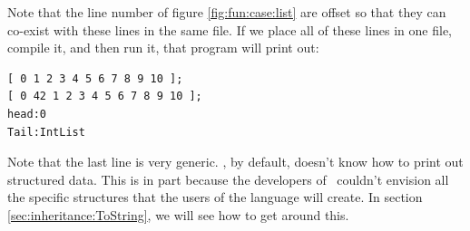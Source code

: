 \inputminted[linenos,lastline=10]{csharp}{../src/csharp/functions/list/Program.cs}

Note that the line number of figure \ref{fig:fun:case:list} are offset so that they can co-exist with these lines in the same file. If we place all of these lines in one file, compile it, and then run it, that program will print out:

\begin{verbatim}
[ 0 1 2 3 4 5 6 7 8 9 10 ];
[ 0 42 1 2 3 4 5 6 7 8 9 10 ];
head:0
Tail:IntList
\end{verbatim}

Note that the last line is very generic. \csharp, by default, doesn't know how to print out structured data. This is in part because the developers of \csharp\ couldn't envision all the specific structures that the users of the language will create. In section \ref{sec:inheritance:ToString}, we will see how to get around this.

